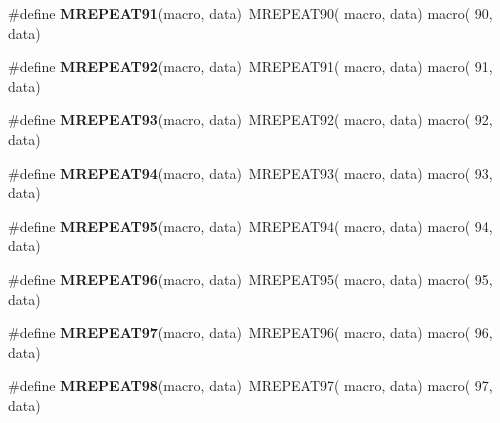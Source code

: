 \begin{DoxyCompactItemize}
\item 
\hypertarget{group__group__xmega__utils__mrepeat_ga34182f160702d4e1b896298efc7eaaac}{\#define {\bfseries M\-R\-E\-P\-E\-A\-T91}(macro, data)~M\-R\-E\-P\-E\-A\-T90( macro, data)   macro( 90, data)}\label{group__group__xmega__utils__mrepeat_ga34182f160702d4e1b896298efc7eaaac}

\item 
\hypertarget{group__group__xmega__utils__mrepeat_gad0cb974b5c2b9677a0127be09057faaf}{\#define {\bfseries M\-R\-E\-P\-E\-A\-T92}(macro, data)~M\-R\-E\-P\-E\-A\-T91( macro, data)   macro( 91, data)}\label{group__group__xmega__utils__mrepeat_gad0cb974b5c2b9677a0127be09057faaf}

\item 
\hypertarget{group__group__xmega__utils__mrepeat_gaa8143ea25cb446fb9e5afa4f79a7fbd8}{\#define {\bfseries M\-R\-E\-P\-E\-A\-T93}(macro, data)~M\-R\-E\-P\-E\-A\-T92( macro, data)   macro( 92, data)}\label{group__group__xmega__utils__mrepeat_gaa8143ea25cb446fb9e5afa4f79a7fbd8}

\item 
\hypertarget{group__group__xmega__utils__mrepeat_ga44f7fcb2a7286d5d105c9d25f400aec2}{\#define {\bfseries M\-R\-E\-P\-E\-A\-T94}(macro, data)~M\-R\-E\-P\-E\-A\-T93( macro, data)   macro( 93, data)}\label{group__group__xmega__utils__mrepeat_ga44f7fcb2a7286d5d105c9d25f400aec2}

\item 
\hypertarget{group__group__xmega__utils__mrepeat_ga40aa5234382c6c5f3f60df82c0dbaa40}{\#define {\bfseries M\-R\-E\-P\-E\-A\-T95}(macro, data)~M\-R\-E\-P\-E\-A\-T94( macro, data)   macro( 94, data)}\label{group__group__xmega__utils__mrepeat_ga40aa5234382c6c5f3f60df82c0dbaa40}

\item 
\hypertarget{group__group__xmega__utils__mrepeat_ga0b773eb3863eaca9403e8db99a4073e6}{\#define {\bfseries M\-R\-E\-P\-E\-A\-T96}(macro, data)~M\-R\-E\-P\-E\-A\-T95( macro, data)   macro( 95, data)}\label{group__group__xmega__utils__mrepeat_ga0b773eb3863eaca9403e8db99a4073e6}

\item 
\hypertarget{group__group__xmega__utils__mrepeat_ga657eb71671586947acb4f1d9eea4ad80}{\#define {\bfseries M\-R\-E\-P\-E\-A\-T97}(macro, data)~M\-R\-E\-P\-E\-A\-T96( macro, data)   macro( 96, data)}\label{group__group__xmega__utils__mrepeat_ga657eb71671586947acb4f1d9eea4ad80}

\item 
\hypertarget{group__group__xmega__utils__mrepeat_ga5488749314737100b1d663aecd83026c}{\#define {\bfseries M\-R\-E\-P\-E\-A\-T98}(macro, data)~M\-R\-E\-P\-E\-A\-T97( macro, data)   macro( 97, data)}\label{group__group__xmega__utils__mrepeat_ga5488749314737100b1d663aecd83026c}


\end{DoxyCompactItemize}
